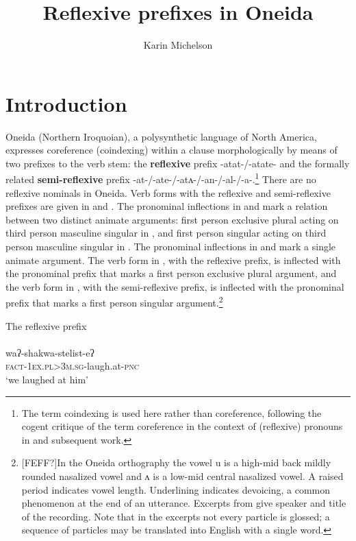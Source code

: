 \documentclass[output=paper]{langscibook}
\author{Karin Michelson\affiliation{University at Buffalo}}
\title{Reflexive prefixes in Oneida}
\begin{document}
\maketitle 

\section{Introduction}\label{sec:oneida:1}

Oneida (Northern Iroquoian), a polysynthetic language of North America, expresses coreference (coindexing) within a clause morphologically by means of two prefixes to the verb stem: 
the \textbf{reflexive} prefix {-atat-/-atate-} and the formally related \textbf{semi-reflexive} pre\-fix {-at-/-ate-/-atʌ-/-an-/-al-/-a-}.\footnote{The term {coindexing} is used here rather than {coreference}, following the cogent critique of the term {coreference} in the context of (reflexive) pronouns in \citet{BachPartee1980} and subsequent work.} There are no reflexive nominals in Oneida. Verb forms with the reflexive and semi-reflexive prefixes are given in  and . The pronominal inflections in  and  mark a relation between two distinct animate arguments: first person exclusive plural acting on third person masculine singular in , and first person singular acting on third person masculine singular in . The pronominal inflections in  and  mark a single animate argument. The verb form in , with the reflexive prefix, is inflected with the pronominal prefix that marks a first person exclusive plural argument, and the verb form in , with the semi-reflexive prefix, is inflected with the pronominal prefix that marks a first person singular argument.\footnote{\textrm{[FEFF?]}In the Oneida orthography the vowel {u} is a high-mid back mildly rounded nasalized vowel and {ʌ} is a low-mid central nasalized vowel. A raised period indicates vowel length. Underlining indicates devoicing, a common phenomenon at the end of an utterance. Excerpts from \citet{MichelsonKennedyDoxtator2016} give speaker and title of the recording. Note that in the excerpts not every particle is glossed; a sequence of particles may be translated into English with a single word.}


\ea%
    The reflexive prefix\\
   \label{ex:oneida:1}
    \ea  
     \label{ex:oneida:1a}
    \\
     waʔ-shakwa-stelist-eʔ\\
         \textsc{fact}-\textsc{1ex.pl>3m.sg}-laugh.at-\textsc{pnc}\\
   \glt ‘we laughed at him’
  
\end{document}
